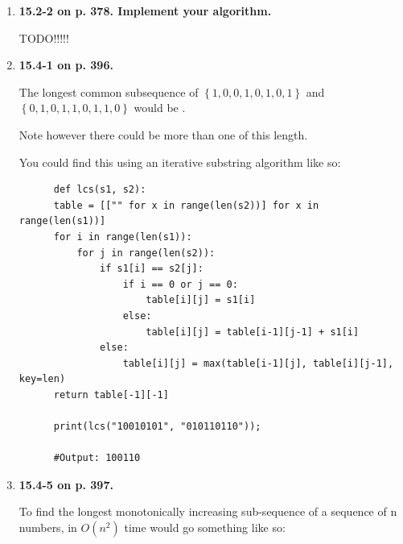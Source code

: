\documentclass{article}
\begin{document}
\begin{enumerate}
    \item \textbf{15.2-2 on p. 378. Implement your algorithm.}
    
    TODO!!!!!

    \item \textbf{15.4-1 on p. 396.}
    
    The longest common subsequence of $\left\{ 1, 0, 0, 1, 0, 1, 0, 1 \right\}$ and $\left\{ 0, 1, 0, 1, 1, 0, 1, 1, 0 \right\}$ would be .
    
    Note however there could be more than one of this length.

    You could find this using an iterative substring algorithm like so:

    \begin{lstlisting}
      def lcs(s1, s2):
      table = [["" for x in range(len(s2))] for x in range(len(s1))]
      for i in range(len(s1)):
          for j in range(len(s2)):
              if s1[i] == s2[j]:
                  if i == 0 or j == 0:
                      table[i][j] = s1[i]
                  else:
                      table[i][j] = table[i-1][j-1] + s1[i]
              else:
                  table[i][j] = max(table[i-1][j], table[i][j-1], key=len)
      return table[-1][-1]

      print(lcs("10010101", "010110110"));

      #Output: 100110
    \end{lstlisting}

    \item \textbf{15.4-5 on p. 397.}
    
    To find the longest monotonically increasing sub-sequence of a sequence of n numbers, in $O(n^2)$ time would go something like so:


\end{enumerate}
\end{document}
